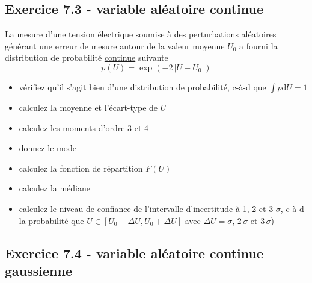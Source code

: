 \subsection*{Exercice 7.3 - variable aléatoire continue}

La mesure d'une tension électrique soumise à des perturbations aléatoires générant une erreur de mesure autour de la valeur moyenne $U_0$ a fourni la distribution de probabilité \underline{continue} suivante
$$
p(U)=\exp{(-2\,|U-U_0|)}
$$
\begin{itemize}
\item vérifiez qu'il s'agit bien d'une distribution de probabilité, c-à-d que $\int p\text{d}U=1$
\item calculez la moyenne et l'écart-type de $U$
\item calculez les moments d'ordre 3 et 4
\item donnez le mode
\item calculez la fonction de répartition $F(U)$
\item calculez la médiane
\item calculez le niveau de confiance de l'intervalle d'incertitude à 1, 2 et 3 $\sigma$, c-à-d la probabilité que $U\in[U_0-\Delta U,U_0+\Delta U]$ avec $\Delta U=\sigma$, $2\,\sigma$ et $3\,\sigma$)
\end{itemize}

\subsection*{Exercice 7.4 - variable aléatoire continue gaussienne}

